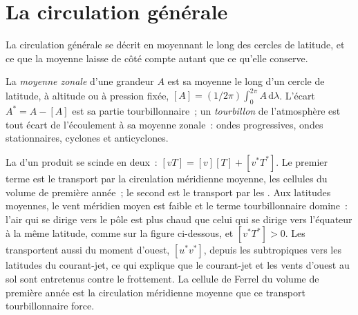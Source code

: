 \section{La circulation générale}\label{sec:b3:atmospheric-dynamics:general-circulation}

La circulation générale se décrit en moyennant le long des cercles de latitude,
et ce que la moyenne laisse de côté compte autant que ce qu'elle conserve.

\begin{definition}\label{def:b3:atmospheric-dynamics:eddy}
La \emph{moyenne zonale} d'une grandeur $A$ est sa moyenne
le long d'un cercle de latitude, à altitude ou à pression fixée, $[A] =
(1/2\pi)\int_0^{2\pi} A\,\mathrm d\lambda$. L'écart $A^* = A - [A]$
est sa partie tourbillonnaire~; un \emph{tourbillon}
de l'atmosphère est tout écart de l'écoulement à sa moyenne zonale~: ondes
progressives, ondes stationnaires, cyclones et anticyclones.
\end{definition}

La  d'un produit se scinde en deux~: $[vT] = [v][T] + [v^*T^*]$. Le
premier terme est le transport par la circulation méridienne moyenne, les cellules
du volume de première année~; le second est le transport par les . Aux
latitudes moyennes, le vent méridien moyen est faible et le terme tourbillonnaire
domine~: l'air qui se dirige vers le pôle est plus chaud que celui qui se dirige
vers l'équateur à la même latitude, comme sur la figure ci-dessous, et $[v^*T^*] > 0$. Les
 transportent aussi du moment d'ouest, $[u^*v^*]$, depuis les subtropiques vers
les latitudes du courant-jet, ce qui explique que le courant-jet et les vents d'ouest au
sol sont entretenus contre le frottement. La cellule de Ferrel du volume de première
année est la circulation méridienne moyenne que ce transport tourbillonnaire force.

